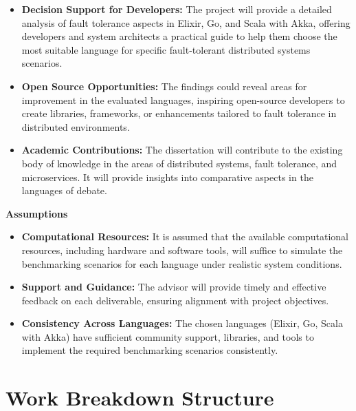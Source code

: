 \begin{itemize}
      \item \textbf{Decision Support for Developers:}
            The project will provide a detailed analysis of fault tolerance aspects in Elixir, Go, and Scala with Akka, offering developers and system architects a practical guide to help them choose the most suitable language for specific fault-tolerant distributed systems scenarios.

      \item \textbf{Open Source Opportunities:}
            The findings could reveal areas for improvement in the evaluated languages, inspiring open-source developers to create libraries, frameworks, or enhancements tailored to fault tolerance in distributed environments.

      \item \textbf{Academic Contributions:}
            The dissertation will contribute to the existing body of knowledge in the areas of distributed systems, fault tolerance, and microservices. It will provide insights into comparative aspects in the languages of debate.

\end{itemize}

\noindent \textbf{Assumptions}

\begin{itemize}
      \item \textbf{Computational Resources:}
            It is assumed that the available computational resources, including hardware and software tools, will suffice to simulate the benchmarking scenarios for each language under realistic system conditions.

      \item \textbf{Support and Guidance:}
            The advisor will provide timely and effective feedback on each deliverable, ensuring alignment with project objectives.

      \item \textbf{Consistency Across Languages:}
            The chosen languages (Elixir, Go, Scala with Akka) have sufficient community support, libraries, and tools to implement the required benchmarking scenarios consistently.
\end{itemize}

\section{Work Breakdown Structure}

